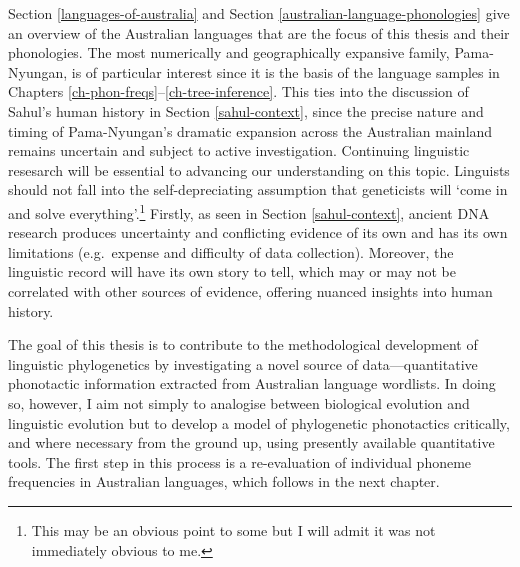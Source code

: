 Section \ref{languages-of-australia} and Section \ref{australian-language-phonologies} give an overview of the Australian languages that are the focus of this thesis and their phonologies. The most numerically and geographically expansive family, Pama-Nyungan, is of particular interest since it is the basis of the language samples in Chapters \ref{ch-phon-freqs}--\ref{ch-tree-inference}. This ties into the discussion of Sahul's human history in Section \ref{sahul-context}, since the precise nature and timing of Pama-Nyungan's dramatic expansion across the Australian mainland remains uncertain and subject to active investigation. Continuing linguistic resesarch will be essential to advancing our understanding on this topic. Linguists should not fall into the self-depreciating assumption that geneticists will `come in and solve everything'.\footnote{This may be an obvious point to some but I will admit it was not immediately obvious to me.} Firstly, as seen in Section \ref{sahul-context}, ancient DNA research produces uncertainty and conflicting evidence of its own and has its own limitations (e.g.~expense and difficulty of data collection). Moreover, the linguistic record will have its own story to tell, which may or may not be correlated with other sources of evidence, offering nuanced insights into human history.

The goal of this thesis is to contribute to the methodological development of linguistic phylogenetics by investigating a novel source of data---quantitative phonotactic information extracted from Australian language wordlists. In doing so, however, I aim not simply to analogise between biological evolution and linguistic evolution but to develop a model of phylogenetic phonotactics critically, and where necessary from the ground up, using presently available quantitative tools. The first step in this process is a re-evaluation of individual phoneme frequencies in Australian languages, which follows in the next chapter.


